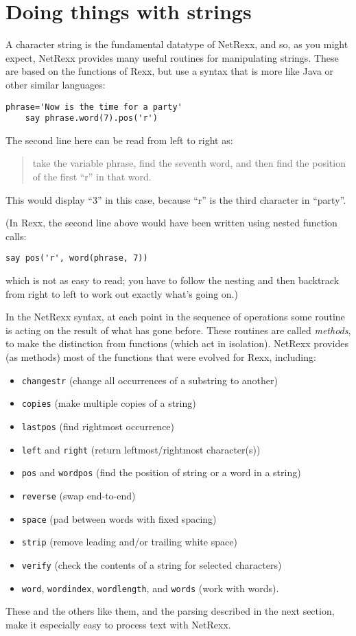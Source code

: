 \section{Doing things with strings}
A character string is the fundamental datatype of NetRexx, and so, as
you might expect, NetRexx provides many useful routines for
manipulating strings. These are based on the functions of Rexx, but
use a syntax that is more like Java or other similar languages:
\begin{lstlisting}[label=strings,caption=Strings]
    phrase='Now is the time for a party'
    say phrase.word(7).pos('r')
\end{lstlisting}
The second line here can be read from left to right as:
\begin{quote}take the variable phrase, find the seventh word, and then find the position of
the first “r” in that word.\end{quote}
This would display “3” in this case, because “r” is the third character in “party”.

(In Rexx, the second line above would have been written using nested
function calls:
\begin{lstlisting}[label=nested,caption=Rexx: Nested]
    say pos('r', word(phrase, 7))
\end{lstlisting}
which is not as easy to read; you have to follow the nesting and then
backtrack from right to left to work out exactly what’s going on.)

In the NetRexx syntax, at each point in the sequence of operations
some routine is acting on the result of what has gone before. These
routines are called \emph{methods}, to make the distinction from functions
(which act in isolation). NetRexx provides (as methods) most of the
functions that were evolved for Rexx, including:
\begin{itemize}
\item \texttt{changestr} (change all occurrences of a substring to another)
\item \texttt{copies} (make multiple copies of a string)
\item \texttt{lastpos} (find rightmost occurrence)
\item \texttt{left} and \texttt{right} (return leftmost/rightmost character(s))
\item \texttt{pos} and \texttt{wordpos} (find the position of string or a word in a string)
\item \texttt{reverse} (swap end-to-end)
\item \texttt{space} (pad between words with fixed spacing)
\item \texttt{strip} (remove leading and/or trailing white space)
\item \texttt{verify} (check the contents of a string for selected characters)
\item \texttt{word}, \texttt{wordindex}, \texttt{wordlength}, and \texttt{words} (work with words).
\end{itemize}
These and the others like them, and the parsing described in the next section, make it especially easy to process text with NetRexx.
